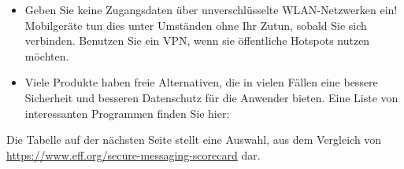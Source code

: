 \documentclass[10pt,foldmark,tumble]{leaflet}
\newcommand{\barcode}[1]{
\begin{pspicture}(1cm,1cm) 
\psbarcode[scalex=0.4,scaley=0.4]{#1}{}{qrcode} 
\end{pspicture}
}
\begin{document}
\begin{itemize}
  
 \item Geben Sie keine Zugangsdaten über unverschlüsselte WLAN-Netzwerken ein! Mobilgeräte tun
 dies unter Umständen ohne Ihr Zutun, sobald Sie sich verbinden. Benutzen Sie ein VPN, wenn sie 
 öffentliche Hotspots nutzen möchten.

 \item Viele Produkte haben freie Alternativen, die in vielen Fällen eine bessere Sicherheit
 und besseren Datenschutz für die Anwender bieten. Eine Liste von interessanten Programmen finden
 Sie hier:
\end{itemize}

\vspace{1cm} 
Die Tabelle auf der nächsten Seite stellt eine Auswahl, aus dem Vergleich von \url{https://www.eff.org/secure-messaging-scorecard} dar.
\end{document}
